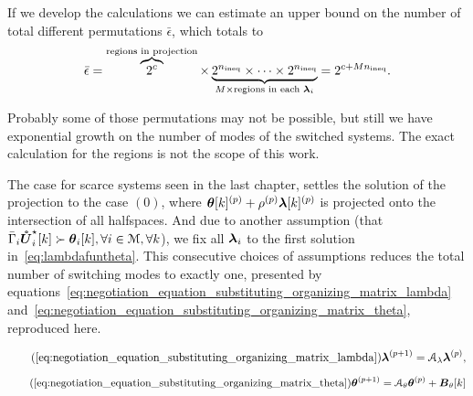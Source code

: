 \documentclass[../main.tex]{subfiles}
\begin{document}
If we develop the calculations we can estimate an upper bound on the number of total different permutations $\bar{\epsilon}$, which totals to
\begin{equation}
  \label{eq:1}
  \bar{\epsilon}=\overbrace{2^{c}}^{\text{regions in projection}}\times \underbrace{2^{n_{\text{ineq}}}\times \dots \times 2^{{n_{\text{ineq}}}}}_{M\times \text{regions in each }\boldsymbol{\lambda}_i }=2^{c+Mn_{\text{ineq}}}.
\end{equation}

\begin{remark}
  Probably some of those permutations may not be possible, but still we have exponential growth on the number of modes of the switched systems.
  The exact calculation for the regions is not the scope of this work.
\end{remark}

The case for scarce systems seen in the last chapter, settles the solution of the projection to the case $(0)$, where $\boldsymbol{\theta}[k]^{(p)}+\rho^{(p)}\boldsymbol{\lambda}[k]^{(p)}$ is projected onto the intersection of all halfspaces.
And due to another assumption (that $\bar{\Gamma}_{i}\optuncUik\succ \thetaik, \forall i\in\set{M}, \forall k$), we fix all $\boldsymbol{\lambda}_i$ to the first solution in~\eqref{eq:lambdafuntheta}.
This consecutive choices of assumptions reduces the total number of switching modes to exactly one, presented by equations~\eqref{eq:negotiation_equation_substituting_organizing_matrix_lambda} and~\eqref{eq:negotiation_equation_substituting_organizing_matrix_theta}, reproduced here.

\begin{equation}
  \label{eq:negotiation_equation_substituting_organizing_matrix_lambda_reprise}
  \tag{\ref*{eq:negotiation_equation_substituting_organizing_matrix_lambda}}
  \vec{\lambda}\pplusone=\mathcal{A}_{\lambda}\vec{\lambda}\p,
\end{equation}
\begin{equation}
  \label{eq:negotiation_equation_substituting_organizing_matrix_theta_reprise}
  \tag{\ref*{eq:negotiation_equation_substituting_organizing_matrix_theta}}
  \vec{\theta}\pplusone=\mathcal{A}_{\theta}\vec{\theta}\p+\mathcal{\vec{B}}_{\theta}[k]
\end{equation}
\end{document}
